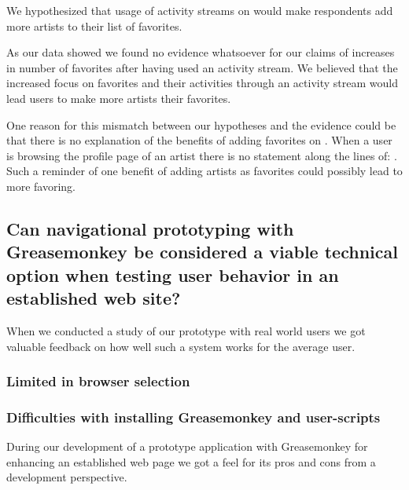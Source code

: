 We hypothesized that usage of activity streams on \urort{} would
make respondents add more artists to their list of favorites.

As our data%
showed we found no evidence whatsoever for our claims of increases in
number of favorites after having used an activity stream.
We believed that the increased focus on favorites and their activities through
an activity stream would lead users to make more artists their favorites.

One reason for this mismatch between our hypotheses and the evidence could be
that there is no explanation of the benefits of adding favorites on \urort{}.
When a user is browsing the profile page of an artist there is no statement
along the lines of: . Such a reminder of one benefit of adding
artists as favorites could possibly lead to more favoring.

\subsection{%
  Can navigational prototyping with Greasemonkey be considered a
  viable technical option when testing user behavior in an
  established web site?
}

When we conducted a study of our prototype with real world users
we got valuable feedback on how well such a system works for the average
user.

\subsubsection{Limited in browser selection}


\subsubsection{Difficulties with installing Greasemonkey and user-scripts}


\parabreak

During our development of a prototype application with Greasemonkey for
enhancing an established web page we got a feel for its pros and cons from a
development perspective.

